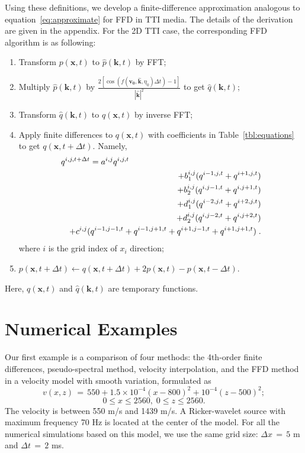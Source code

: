Using these definitions, 
we develop a finite-difference approximation analogous to equation~\ref{eq:approximate} for FFD in TTI media. The details of the derivation are given in the appendix.
For the 2D TTI case, the corresponding FFD algorithm is as following:
\begin{enumerate}
\item Transform $p(\mathbf{x},t)$ to $\hat{p}(\mathbf{k},t)$ by FFT;
\item Multiply $\hat{p}(\mathbf{k},t)$ by $\displaystyle\frac{2[\cos(f(\mathbf{v_0},\mathbf{\hat{k}},\eta_0)\Delta t)-1]}{|\mathbf{\hat{k}}|^2}$ to get $\hat{q}(\mathbf{k},t)$;
\item Transform $\hat{q}(\mathbf{k},t)$ to $q(\mathbf{x},t)$ by inverse FFT;
\item Apply finite differences to $q(\mathbf{x},t)$ with coefficients in Table~\ref{tbl:equations} to get $q(\mathbf{x},t+\Delta t)$. Namely,
\begin{eqnarray}
\label{eq:fd}
\lefteqn{q^{i,j,t+\Delta t} = a^{i,j}q^{i,j,t}} \\
& & +b_1^{i,j}(q^{i-1,j,t}+q^{i+1,j,t}) \nonumber \\
& & +b_2^{i,j}(q^{i,j-1,t}+q^{i,j+1,t})\nonumber \\
& & +d_1^{i,j}(q^{i-2,j,t}+q^{i+2,j,t}) \nonumber \\
& & +d_2^{i,j}(q^{i,j-2,t}+q^{i,j+2,t})\nonumber \\
& & +c^{i,j}(q^{i-1,j-1,t}+q^{i-1,j+1,t}+q^{i+1,j-1,t}+q^{i+1,j+1,t})\nonumber\;.
\end{eqnarray} 
where $i$ is the grid index of $x_i$ direction;
\item $p(\mathbf{x},t+\Delta t) \leftarrow q(\mathbf{x},t+\Delta t) + 2p(\mathbf{x},t) - p(\mathbf{x}, t-\Delta t)$.
\end{enumerate}
Here, $q(\mathbf{x},t)$ and $\hat{q}(\mathbf{k},t)$ are temporary functions.\\



\section{Numerical Examples}


Our first example is a comparison of four methods: the 4th-order finite differences, pseudo-spectral method, velocity interpolation, and the FFD method 
in a velocity model with smooth variation, formulated as 
$$v(x,z)\,=\,550+1.5\times10^{-4}(x-800)^2+10^{-4}(z-500)^2;$$
$$0\le x\le2560,\;0\le z\le2560.$$
The velocity is between 550 m/s and 1439 m/s.
A Ricker-wavelet source with maximum frequency 70 Hz is located at the center of the model. For all the numerical simulations based on this model, we use the same grid size: $\Delta x\,=\,5$ m and $\Delta t\,=\,2$ ms.\\

